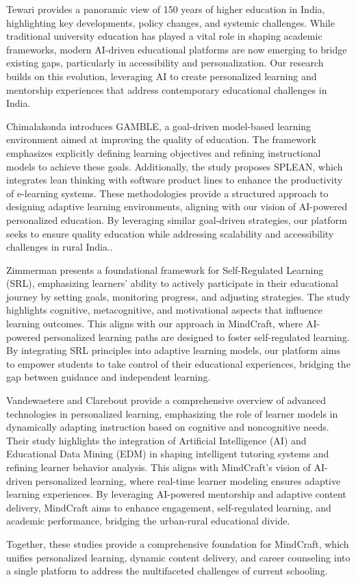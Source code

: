 Tewari \cite{ref9} provides a panoramic view of 150 years of higher education in India, highlighting key developments, policy changes, and systemic challenges. While traditional university education has played a vital role in shaping academic frameworks, modern AI-driven educational platforms are now emerging to bridge existing gaps, particularly in accessibility and personalization. Our research builds on this evolution, leveraging AI to create personalized learning and mentorship experiences that address contemporary educational challenges in India.

Chimalakonda \cite{ref10} introduces GAMBLE, a goal-driven model-based learning environment aimed at improving the quality of education. The framework emphasizes explicitly defining learning objectives and refining instructional models to achieve these goals. Additionally, the study proposes SPLEAN, which integrates lean thinking with software product lines to enhance the productivity of e-learning systems. These methodologies provide a structured approach to designing adaptive learning environments, aligning with our vision of AI-powered personalized education. By leveraging similar goal-driven strategies, our platform seeks to ensure quality education while addressing scalability and accessibility challenges in rural India..

Zimmerman \cite{ref11} presents a foundational framework for Self-Regulated Learning (SRL), emphasizing learners' ability to actively participate in their educational journey by setting goals, monitoring progress, and adjusting strategies. The study highlights cognitive, metacognitive, and motivational aspects that influence learning outcomes. This aligns with our approach in MindCraft, where AI-powered personalized learning paths are designed to foster self-regulated learning. By integrating SRL principles into adaptive learning models, our platform aims to empower students to take control of their educational experiences, bridging the gap between guidance and independent learning.


Vandewaetere and Clarebout \cite{ref12} provide a comprehensive overview of advanced technologies in personalized learning, emphasizing the role of learner models in dynamically adapting instruction based on cognitive and noncognitive needs. Their study highlights the integration of Artificial Intelligence (AI) and Educational Data Mining (EDM) in shaping intelligent tutoring systems and refining learner behavior analysis. This aligns with MindCraft's vision of AI-driven personalized learning, where real-time learner modeling ensures adaptive learning experiences. By leveraging AI-powered mentorship and adaptive content delivery, MindCraft aims to enhance engagement, self-regulated learning, and academic performance, bridging the urban-rural educational divide.

Together, these studies provide a comprehensive foundation for MindCraft, which unifies personalized learning, dynamic content delivery, and career counseling into a single platform to address the multifaceted challenges of current schooling.

